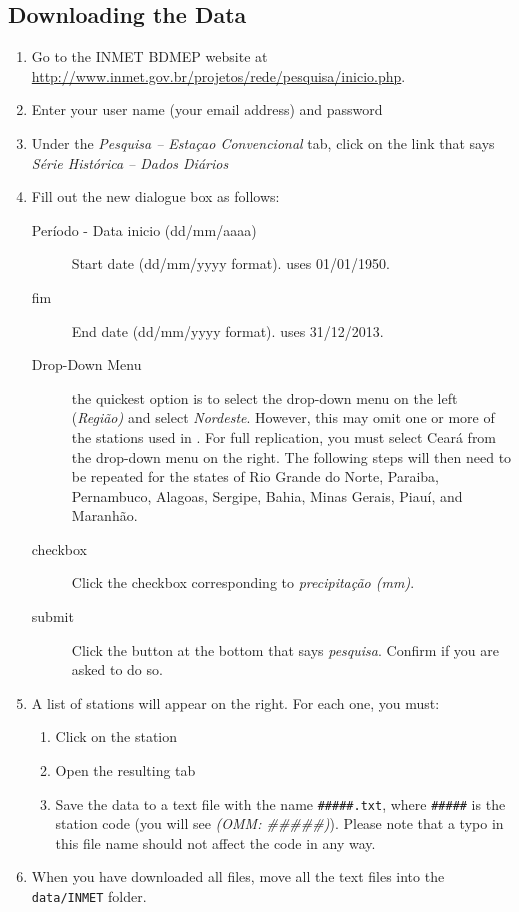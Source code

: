 \documentclass[11pt]{article} %
\newcommand{\fn}[1]{\texttt{#1}} %
\newcommand{\code}[1]{\texttt{#1}} %
\newcommand{\usee}[1]{\textit{#1}} %
\begin{document}
\subsection{Downloading the Data}
\begin{enumerate}
\item Go to the \ac{INMET} \ac{BDMEP} website at \url{http://www.inmet.gov.br/projetos/rede/pesquisa/inicio.php}.
\item Enter your user name (your email address) and password
\item Under the \usee{Pesquisa -- Esta\c{c}ao Convencional} tab, click on the link that says \usee{S\'{e}rie Hist\'{o}rica -- Dados Di\'{a}rios}

\item Fill out the new dialogue box as follows:
\begin{description}
\item[Per\'{i}odo - Data inicio (dd/mm/aaaa)] Start date (dd/mm/yyyy format). \citet{dossgollin2015} uses 01/01/1950.
\item[fim] End date (dd/mm/yyyy format). \citet{dossgollin2015} uses 31/12/2013.
\item[Drop-Down Menu] the quickest option is to select the drop-down menu on the left (\usee{Regi\~{a}o)} and select \usee{Nordeste}. However, this may omit one or more of the stations used in \cite{dossgollin2015}. For full replication, you must select Cear\'{a} from the drop-down menu on the right. The following steps will then need to be repeated for the states of Rio Grande do Norte, Paraiba, Pernambuco, Alagoas, Sergipe, Bahia, Minas Gerais, Piau\'{i}, and Maranh\~{a}o.
\item[checkbox] Click the checkbox corresponding to \usee{precipita\c{c}\~{a}o (mm)}.
\item[submit] Click the button at the bottom that says \usee{pesquisa}. Confirm if you are asked to do so.
\end{description}

\item A list of stations will appear on the right. For each one, you must:
\begin{enumerate}
\item Click on the station
\item Open the resulting tab
\item Save the data to a text file with the name \code{\#\#\#\#\#.txt}, where \code{\#\#\#\#\#} is the station code (you will see \usee{(OMM: \#\#\#\#\#)}). Please note that a typo in this file name should not affect the code in any way.
\end{enumerate}
\item When you have downloaded all files, move all the text files into the \fn{data/INMET} folder. 
\end{enumerate}
\end{document}
